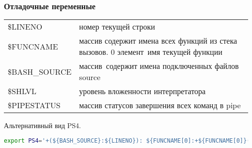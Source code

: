 \begin{frame}[fragile]
	\frametitle{Отладочные переменные}

  \begin{tabular}{ l  p{7cm} }
    \alert{\$LINENO}  & номер текущей строки \\ 
    \alert{\$FUNCNAME} & массив содержит имена всех функций из стека вызовов. 0 элемент\, имя текущей функции \\
    \alert{\$BASH\_SOURCE} & массив\, содержит имена подключенных файлов source\\
    \alert{\$SHLVL} & уровень вложенности интерпретатора \\
    \alert{\$PIPESTATUS} & массив статусов завершения всех команд в pipe \\
    \end{tabular}

	\begin{block}{Альтернативный вид PS4.}
		\begin{lstlisting}[language=sh]
export PS4='+(${BASH_SOURCE}:${LINENO}): ${FUNCNAME[0]:+${FUNCNAME[0]}(): }'
		\end{lstlisting}
	\end{block}
\end{frame}
